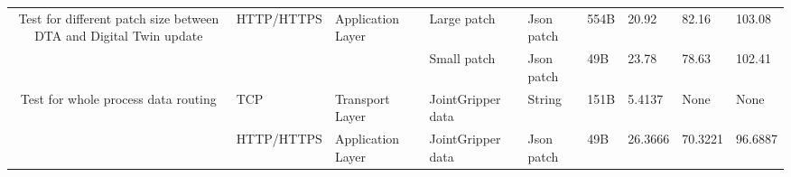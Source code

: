 \begin{landscape}
\begin{table}[]
{\begin{tabular}{@{}cclllllll@{}}
    \multirow{2}{*}{Test for different patch size between DTA and Digital Twin update}   & \multirow{2}{*}{HTTP/HTTPS}    & Application Layer                              & Large patch                                    & Json patch                      & 554B                            & 20.92            & 82.16           & 103.08   \\
                                                                                         &                                &                                                & Small patch                                    & Json patch                      & 49B                             & 23.78            & 78.63           & 102.41   \\
    \multirow{2}{*}{Test for whole process data routing}                                 & \multicolumn{1}{l}{TCP}        & Transport Layer                                & JointGripper data                              & String                          & 151B                            & 5.4137           & None            & None     \\
                                                                                         & \multicolumn{1}{l}{HTTP/HTTPS} & Application Layer                              & JointGripper data                              & Json patch                      & 49B                             & 26.3666          & 70.3221         & 96.6887 
    \end{tabular}%
    }
    \end{table}
    \end{landscape}